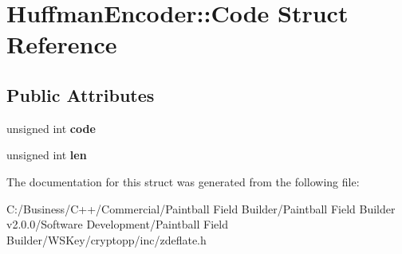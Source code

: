 \hypertarget{struct_huffman_encoder_1_1_code}{
\section{HuffmanEncoder::Code Struct Reference}
\label{struct_huffman_encoder_1_1_code}
}
\subsection*{Public Attributes}
\begin{DoxyCompactItemize}
\item 
\hypertarget{struct_huffman_encoder_1_1_code_a824793f1532f9e42159512b3b8f5d0dc}{
unsigned int {\bfseries code}}
\label{struct_huffman_encoder_1_1_code_a824793f1532f9e42159512b3b8f5d0dc}

\item 
\hypertarget{struct_huffman_encoder_1_1_code_aa258e9ba11dd8c4a76bf5896559f49d4}{
unsigned int {\bfseries len}}
\label{struct_huffman_encoder_1_1_code_aa258e9ba11dd8c4a76bf5896559f49d4}

\end{DoxyCompactItemize}


The documentation for this struct was generated from the following file:\begin{DoxyCompactItemize}
\item 
C:/Business/C++/Commercial/Paintball Field Builder/Paintball Field Builder v2.0.0/Software Development/Paintball Field Builder/WSKey/cryptopp/inc/zdeflate.h\end{DoxyCompactItemize}
